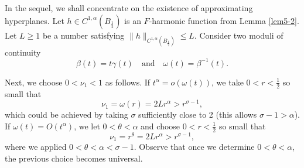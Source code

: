 \documentclass[11pt,reqno]{amsart}
\numberwithin{equation}{section}
\begin{document}
In the sequel, we shall concentrate on the existence of approximating hyperplanes. Let $h\in C^{1,\alpha}(B_{\frac12})$ is an $F$-harmonic function from Lemma \ref{lem5-2}. Let $L\ge1$ be a number satisfying $\|h\|_{C^{1,\alpha}(B_{\frac12})}\le L$. Consider two moduli of continuity
$$
\beta(t)=t\gamma(t) \quad\text{and}\quad  \omega(t)=\beta^{-1}(t).
$$

Next, we choose $0<\nu_1<1$ as follows. If $t^\alpha=o(\omega(t))$, we take $0<r<\frac12$ so small that
$$
\nu_1=\omega(r)=2Lr^\alpha>r^{\sigma-1},
$$
which could be achieved by taking $\sigma$ sufficiently close to 2 (this allows $\sigma-1>\alpha$).
If $\omega(t)=O(t^\alpha)$, we let $0<\theta <\alpha$ and choose $0<r<\frac12$ so small that
$$
\nu_1=r^\theta=2Lr^\alpha>r^{\sigma-1},
$$
where we applied $0<\theta<\alpha<\sigma-1$. Observe that once we determine $0<\theta <\alpha$, the previous choice becomes universal.
\end{document}
